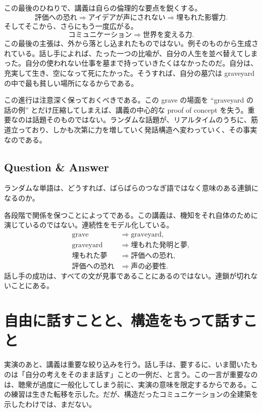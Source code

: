 この最後のひねりで、講義は自らの倫理的な要点を鋭くする。
\begin{equation}
\text{評価への恐れ} \Longrightarrow \text{アイデアが声にされない} \Longrightarrow \text{埋もれた影響力}.
\end{equation}
そしてそこから、さらにもう一度広がる。
\begin{equation}
\text{コミュニケーション} \Longrightarrow \text{世界を変える力}.
\end{equation}
この最後の主張は、外から落とし込まれたものではない。例そのものから生成されている。話し手によれば、たった一つの比喩が、自分の人生を並べ替えてしまった。自分の使われない仕事を墓まで持っていきたくはなかったのだ。自分は、充実して生き、空になって死にたかった。そうすれば、自分の墓穴は graveyard の中で最も貧しい場所になるからである。

この進行は注意深く保っておくべきである。この grave の場面を ``graveyard の話の例'' とだけ圧縮してしまえば、講義の中心的な proof of concept を失う。重要なのは話題そのものではない。ランダムな話題が、リアルタイムのうちに、筋道立っており、しかも次第に力を増していく発話構造へ変わっていく、その事実なのである。

\subsection{Question \& Answer}

ランダムな単語は、どうすれば、ばらばらのつなぎ語ではなく意味のある連鎖になるのか。

各段階で関係を保つことによってである。この講義は、機知をそれ自体のために演じているのではない。連続性をモデル化している。
\begin{align}
\text{grave} &\Longrightarrow \text{graveyard},\\
\text{graveyard} &\Longrightarrow \text{埋もれた発明と夢},\\
\text{埋もれた夢} &\Longrightarrow \text{評価への恐れ},\\
\text{評価への恐れ} &\Longrightarrow \text{声の必要性}.
\end{align}
話し手の成功は、すべての文が見事であることにあるのではない。連鎖が切れないことにある。

\section{自由に話すことと、構造をもって話すこと}

実演のあと、講義は重要な絞り込みを行う。話し手は、要するに、いま聞いたものは「自分の考えをそのまま話す」ことの一例だ、と言う。この一言が重要なのは、聴衆が過度に一般化してしまう前に、実演の意味を限定するからである。この練習は生きた転移を示した。だが、構造だったコミュニケーションの全建築を示したわけでは、まだない。

